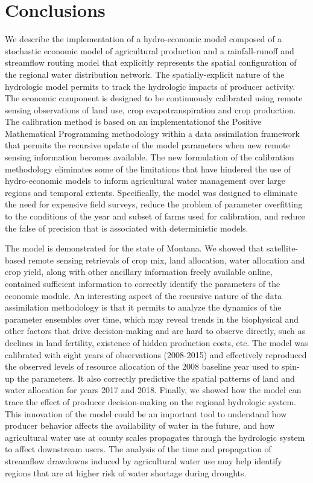 \section{Conclusions}

We describe the implementation of a hydro-economic model composed of a stochastic economic model of agricultural production and a rainfall-runoff and streamflow routing model that explicitly represents the spatial configuration of the regional water distribution network. The spatially-explicit nature of the hydrologic model permits to track the hydrologic impacts of producer activity. The economic component is designed to be continuously calibrated using remote sensing observations of land use, crop evapotranspiration and crop production. The calibration method is based on an implementationof the Positive Mathematical Programming methodology within a data assimilation framework that permits the recursive update of the model parameters when new remote sensing information becomes available.   The new formulation of the calibration methodology eliminates some of the limitations that have hindered the use of hydro-economic models to inform agricultural water management over large regions and temporal extents. Specifically, the model was designed to eliminate the need for expensive field surveys, reduce the problem of parameter overfitting to the conditions of the year and subset of farms used for calibration, and  reduce the false of precision that is associated with deterministic models.

The model is demonstrated for the state of Montana. We showed that satellite-based remote sensing retrievals of crop mix, land allocation, water allocation and crop yield, along with other ancillary information freely available online, contained sufficient information to correctly identify the parameters of the economic module. An interesting aspect of the recursive nature of the data assimilation methodology is that it permits to analyze the dynamics of the parameter ensembles over time, which may reveal trends in the biophysical and other factors that drive decision-making and are hard to observe directly, such as declines in land fertility, existence of hidden production costs, etc. The model was calibrated with eight years of observations (2008-2015) and effectively reproduced the observed levels of resource allocation of the 2008 baseline year used to spin-up the parameters. It also correctly predictive the spatial patterns of land and water allocation for years 2017 and 2018. Finally, we showed how the model can trace the effect of producer decision-making on the regional hydrologic system. This innovation of the model could be an important tool to understand how producer behavior affects the availability of water in the future, and how agricultural water use at county scales propagates through the hydrologic system to affect downstream users. The analysis of the time and propagation of streamflow drawdowns induced by agricultural water use may help identify regions that are at higher risk of water shortage during droughts.  